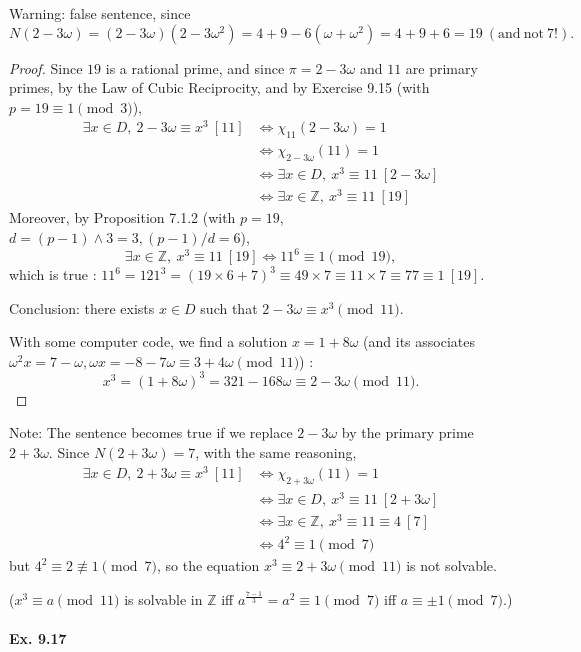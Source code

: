 \documentclass[11pt,a4paper]{article}
\newcommand{\Z}{\mathbb{Z}}
\begin{document}
\bigskip
Warning: false sentence, since 
$$N(2 - 3 \omega) = (2-3\omega)(2 - 3 \omega^2) = 4 + 9 -6(\omega+\omega^2) = 4 + 9 + 6 = 19 \ (\mathrm{and}\ \mathrm{not}\ 7!).$$
\begin{proof}
Since $19$ is a rational prime, and since $\pi= 2 - 3\omega$ and $11$  are primary primes, by the Law of Cubic Reciprocity, and by Exercise 9.15 (with $p=19 \equiv 1 \pmod 3$),
\begin{align*}
\exists x \in D,\ 2-3\omega \equiv x^3\ [11]&\iff \chi_{11}(2-3\omega) = 1\\
&\iff \chi_{2-3\omega}(11)=1\\
&\iff \exists x \in D,\  x^3 \equiv 11\  [2 - 3 \omega]\\
&\iff \exists x \in \mathbb{Z},\  x^3 \equiv 11\  [19]
\end{align*}
Moreover, by Proposition 7.1.2 (with $p = 19$, $d = (p-1) \wedge 3 = 3, (p-1)/d = 6$),
$$\exists x \in \mathbb{Z},\  x^3 \equiv 11\  [19] \iff 11^6 \equiv 1 \pmod {19},$$
which is true : $11^6 = 121^3 = (19 \times 6 + 7)^3 \equiv 49 \times 7 \equiv 11 \times 7 \equiv 77 \equiv 1 \ [19]$.

Conclusion: there exists $x \in D$ such that $2-3\omega  \equiv x^3 \pmod {11}$.

With some computer code, we find a solution $x = 1 + 8\omega$ (and its associates $\omega^2 x =  7 - \omega, \omega x = -8- 7\omega \equiv 3 + 4 \omega \pmod{11} $) :
$$x^3 = (1+8\omega)^3 = 321 - 168 \omega \equiv 2 - 3 \omega \pmod {11}.$$
\end{proof}

Note: The sentence becomes true if we replace $2 - 3\omega$ by the primary prime $2+3\omega$. Since $N(2+3\omega) = 7$, with the same reasoning,
\begin{align*}
\exists x \in D,\ 2+3\omega \equiv x^3\ [11]
&\iff \chi_{2+3\omega}(11)=1\\
&\iff \exists x \in D,\  x^3 \equiv 11\  [2 + 3 \omega]\\
&\iff \exists x \in \mathbb{Z},\  x^3 \equiv 11 \equiv 4\  [7]\\
&\iff 4^2 \equiv 1 \pmod 7
\end{align*}
but $4^2 \equiv 2 \not \equiv 1 \pmod 7$, so the equation $x^3 \equiv 2 + 3\omega \pmod {11}$ is not solvable.

($x^3 \equiv a \pmod {11}$ is solvable in $\Z$ iff $a^\frac{7-1}{3} = a^2 \equiv 1 \pmod 7$ iff $a \equiv \pm 1 \pmod 7$.)



\paragraph{Ex. 9.17}
\end{document}
